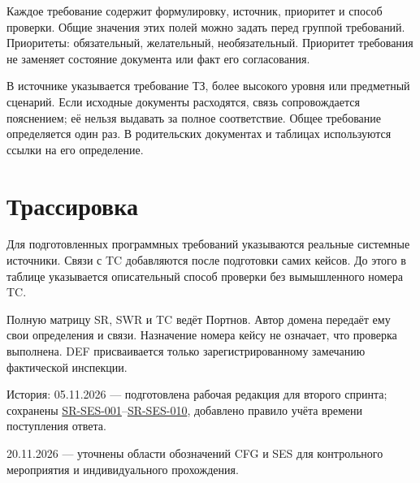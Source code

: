 \documentclass[12pt,a4paper]{article}
\begin{document}
Каждое требование содержит формулировку, источник, приоритет и способ проверки. Общие значения этих полей можно задать перед группой требований. Приоритеты: обязательный, желательный, необязательный. Приоритет требования не заменяет состояние документа или факт его согласования.

В источнике указывается требование ТЗ, более высокого уровня или предметный сценарий. Если исходные документы расходятся, связь сопровождается пояснением; её нельзя выдавать за полное соответствие. Общее требование определяется один раз. В родительских документах и таблицах используются ссылки на его определение.

\section{Трассировка}\label{ux442ux440ux430ux441ux441ux438ux440ux43eux432ux43aux430}

\hypertarget{трассировка}{}

Для подготовленных программных требований указываются реальные системные источники. Связи с TC добавляются после подготовки самих кейсов. До этого в таблице указывается описательный способ проверки без вымышленного номера TC.

Полную матрицу SR, SWR и TC ведёт Портнов. Автор домена передаёт ему свои определения и связи. Назначение номера кейсу не означает, что проверка выполнена. DEF присваивается только зарегистрированному замечанию фактической инспекции.

История: 05.11.2026 --- подготовлена рабочая редакция для второго спринта; сохранены {\href{../../04\_Системные\_требования/DOC-05\_Системные\_требования.pdf\#sr-ses-001}{SR-SES-001}}--{\href{../../04\_Системные\_требования/DOC-05\_Системные\_требования.pdf\#sr-ses-010}{SR-SES-010}}, добавлено правило учёта времени поступления ответа.

20.11.2026 --- уточнены области обозначений CFG и SES для контрольного мероприятия и индивидуального прохождения.
\end{document}
